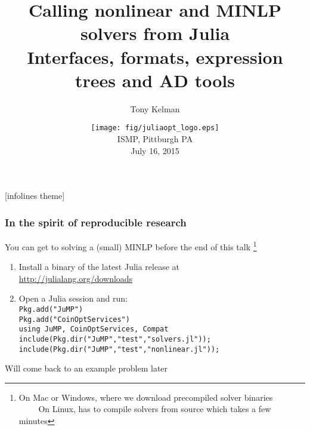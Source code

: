 \documentclass[compressed,dvips,letter]{beamer}
\title[Calling MINLP solvers from Julia]
{Calling nonlinear and MINLP solvers from Julia\\
\vspace{5pt}
\small Interfaces, formats, expression trees and AD tools
\vspace{-10pt}}
\author{Tony Kelman}
\institute[UC Berkeley]
{
  University of California, Berkeley \\
  
  \vspace{5pt}
  {\fontfamily{pcr}\selectfont kelman@berkeley.edu} \\

  \vspace{5pt}
  \url{https://github.com/tkelman}
}
\date[ISMP, July 16 2015]{\texttt{[image: fig/juliaopt\_logo.eps]}
\\ISMP, Pittburgh PA\\July 16, 2015}
\makeatletter
\newcommand{\verbatimfont}[1]{\def\verbatim@font{#1}}%
\makeatother
\begin{document}
\verbatimfont{\fontfamily{pcr}\selectfont}

\begin{frame}
  \titlepage
\end{frame}


%
%
\setcounter{framenumber}{0}
[infolines theme]



\begin{frame}[fragile]\frametitle{In the spirit of reproducible research}

You can get to solving a (small) MINLP before the end of this talk
\footnote{On Mac or Windows, where we download precompiled solver binaries \\
~~~~ On Linux, has to compile solvers from source which takes a few minutes}

  \begin{enumerate}
    \item Install a binary of the latest Julia release at \\
      \url{http://julialang.org/downloads}
    \item Open a Julia session and run: \\
      \texttt{Pkg.add("JuMP") \\
      Pkg.add("CoinOptServices") \\
      using JuMP, CoinOptServices, Compat \\
      include(Pkg.dir("JuMP","test","solvers.jl")); \\
      include(Pkg.dir("JuMP","test","nonlinear.jl"));}
  \end{enumerate}

Will come back to an example problem later

\end{frame}
%
%
\end{document}
